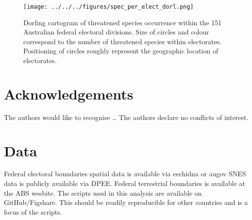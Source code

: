 \documentclass[a4paper,11pt]{article}
\begin{document}
\begin{figure}[H]
	\centering
    \texttt{[image: ../../../figures/spec\_per\_elect\_dorl.png]}
    \caption{Dorling cartogram of threatened species occurrence within the 151 Australian federal electoral divisions. Size of circles and colour correspond to the number of threatened species within electorates. Positioning of circles roughly represent the geographic location of electorates.}
    \label{fig:dorl}
\end{figure}

\newpage
\section{Acknowledgements}
The authors would like to recognise \ldots
The authors declare no conflicts of interest.

\newpage
\section{Data}
Federal electoral boundaries spatial data is available via eechidna or augov
SNES data is publicly available via DPEE.
Federal terrestrial boundaries is available at the ABS wesbite.
The scripts used in this analysis are available on GitHub/Figshare. This should be readily reproducible for other countries and is a focus of the scripts.
\end{document}
